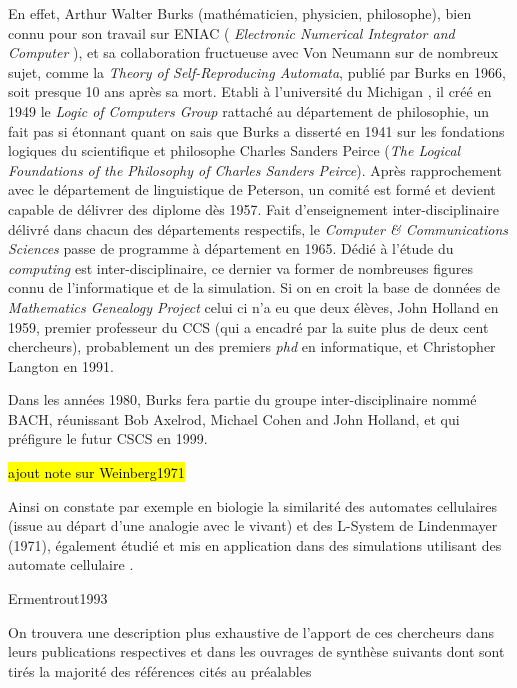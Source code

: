 En effet, Arthur Walter Burks (mathématicien, physicien, philosophe), bien connu pour son travail sur ENIAC ( \textit{Electronic Numerical Integrator and Computer} ), et sa collaboration fructueuse avec Von Neumann sur de nombreux sujet, comme la \textit{Theory of Self-Reproducing Automata}, publié par Burks en 1966, soit presque 10 ans après sa mort. Etabli à l'université du Michigan , il créé en 1949 le \textit{Logic of Computers Group} rattaché au département de philosophie, un fait pas si étonnant quant on sais que Burks a disserté en 1941 sur les fondations logiques du scientifique et philosophe Charles Sanders Peirce (\textit{The Logical Foundations of the Philosophy of Charles Sanders Peirce}). Après rapprochement avec le département de linguistique de Peterson, un comité est formé et devient capable de délivrer des diplome dès 1957. Fait d'enseignement inter-disciplinaire délivré dans chacun des départements respectifs, le \textit{Computer \& Communications Sciences} passe de programme à département en 1965. Dédié à l'étude du \textit{computing} est inter-disciplinaire, ce dernier va former de nombreuses figures connu de l'informatique et de la simulation. Si on en croit la base de données de \textit{Mathematics Genealogy Project} celui ci n'a eu que deux élèves, John Holland en 1959, premier professeur du CCS (qui a encadré par la suite plus de deux cent chercheurs), probablement un des premiers \textit{phd} en informatique, et Christopher Langton en 1991.


Dans les années 1980, Burks fera partie du groupe inter-disciplinaire nommé BACH, réunissant Bob Axelrod, Michael Cohen and John Holland, et qui préfigure le futur CSCS en 1999.

\hl{ ajout note sur Weinberg1971 }

Ainsi on constate par exemple en biologie la similarité \autocite{Hermann1973, Hogeweg1974, Stauffer1998} des automates cellulaires (issue au départ d'une analogie avec le vivant) et des L-System \autocite{Prusinkiewicz1999} de Lindenmayer (1971), également étudié et mis en application dans des simulations utilisant des automate cellulaire \autocites{Hogeweg1978, Frijters1974}.

Ermentrout1993

On trouvera une description plus exhaustive de l'apport de ces chercheurs dans leurs publications respectives et dans les ouvrages de synthèse suivants dont sont tirés la majorité des références cités au préalables \autocites{Dyson1997,Fogel1998, Sipper1998, Fogel2006a}[46-66]{Taylor1999}

